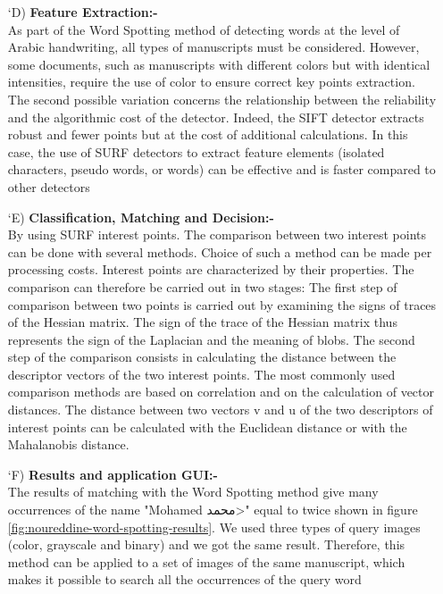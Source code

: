 \begin{itemize}[labelindent=1em,labelsep=0.25cm,leftmargin=*]
        \item[\char `D)] \textbf{Feature Extraction:-} \\
        As part of the Word Spotting method of detecting words at the level of Arabic handwriting, all types of manuscripts must be considered. However, some documents, such as manuscripts with different colors but with identical intensities, require the use of color to ensure correct key points extraction. The second possible variation concerns the relationship between the reliability and the algorithmic cost of the detector. Indeed, the SIFT detector extracts robust and fewer points but at the cost of additional calculations. In this case, the use of SURF detectors to extract feature elements (isolated characters, pseudo words, or words) can be effective and is faster compared to other detectors
        
        \item[\char `E)] \textbf{Classification, Matching and Decision:-} \\
        By using SURF interest points. The comparison between two interest points can be done with several methods. Choice of such a method can be made per processing costs. Interest points are characterized by their properties. The comparison can therefore be carried out in two stages: The first step of comparison between two points is carried out by examining the signs of traces of the Hessian matrix. The sign of the trace of the Hessian matrix thus represents the sign of the Laplacian and the meaning of blobs. The second step of the comparison consists in calculating the distance between the descriptor vectors of the two interest points. The most commonly used comparison methods are based on correlation and on the calculation of vector distances. The distance between two vectors v and u of the two descriptors of interest points can be calculated with the Euclidean distance or with the Mahalanobis distance.
        \item[\char `F)] \textbf{Results and application GUI:-} \\
        The results of matching with the Word Spotting method give many occurrences of the name "Mohamed \<محمد>" equal to twice shown in figure \ref{fig:noureddine-word-spotting-results}. We used three types of query images (color, grayscale and binary) and we got the same result. Therefore, this method can be applied to a set of images of the same manuscript, which makes it possible to search all the occurrences of the query word


\end{itemize}
